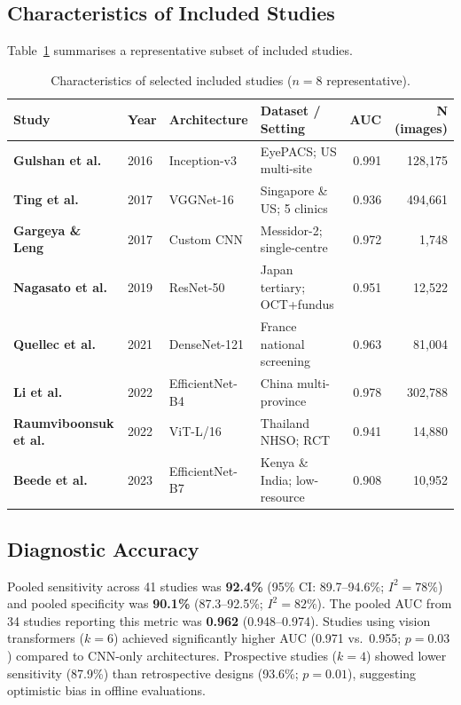 \documentclass[11pt,a4paper]{article}
\begin{document}
\subsection{Characteristics of Included Studies}

Table~\ref{tab:studies} summarises a representative subset of included studies.

\vspace{2mm}
\begin{table}[h!]
\centering
\caption{Characteristics of selected included studies (\(n = 8\) representative).}
\label{tab:studies}
\small
\begin{tabularx}{\linewidth}{@{}
  >{\bfseries}l
  l
  l
  >{\raggedright\arraybackslash}X
  r
  r
@{}}
\toprule
\color{accent}Study & \color{accent}Year & \color{accent}Architecture
  & \color{accent}Dataset / Setting
  & \color{accent}AUC & \color{accent}N (images) \\
\midrule
Gulshan et al.    & 2016 & Inception-v3   & EyePACS; US multi-site           & 0.991 & 128,175 \\
Ting et al.       & 2017 & VGGNet-16      & Singapore \& US; 5 clinics       & 0.936 & 494,661 \\
Gargeya \& Leng   & 2017 & Custom CNN     & Messidor-2; single-centre        & 0.972 &  1,748  \\
Nagasato et al.   & 2019 & ResNet-50      & Japan tertiary; OCT+fundus       & 0.951 & 12,522  \\
Quellec et al.    & 2021 & DenseNet-121   & France national screening        & 0.963 & 81,004  \\
Li et al.         & 2022 & EfficientNet-B4& China multi-province             & 0.978 & 302,788 \\
Raumviboonsuk et al.& 2022 & ViT-L/16     & Thailand NHSO; RCT               & 0.941 & 14,880  \\
Beede et al.      & 2023 & EfficientNet-B7& Kenya \& India; low-resource     & 0.908 & 10,952  \\
\bottomrule
\end{tabularx}
\end{table}

\subsection{Diagnostic Accuracy}

Pooled sensitivity across 41 studies was \textbf{92.4\%} (95\% CI: 89.7–94.6\%;
\(I^2 = 78\%\)) and pooled specificity was \textbf{90.1\%} (87.3–92.5\%;
\(I^2 = 82\%\)). The pooled AUC from 34 studies reporting this metric was \textbf{0.962}
(0.948–0.974). Studies using vision transformers (\(k = 6\)) achieved significantly
higher AUC (0.971 vs.\ 0.955; \(p = 0.03\)) compared to CNN-only architectures.
Prospective studies (\(k = 4\)) showed lower sensitivity (87.9\%) than retrospective
designs (93.6\%; \(p = 0.01\)), suggesting optimistic bias in offline evaluations.
\end{document}
